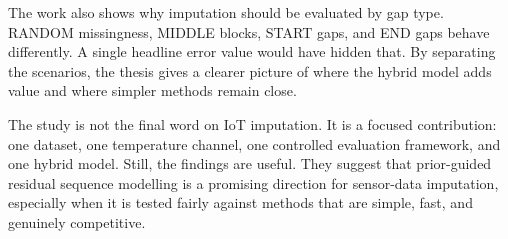 The work also shows why imputation should be evaluated by gap type. RANDOM missingness, MIDDLE blocks, START gaps, and END gaps behave differently. A single headline error value would have hidden that. By separating the scenarios, the thesis gives a clearer picture of where the hybrid model adds value and where simpler methods remain close.

The study is not the final word on IoT imputation. It is a focused contribution: one dataset, one temperature channel, one controlled evaluation framework, and one hybrid model. Still, the findings are useful. They suggest that prior-guided residual sequence modelling is a promising direction for sensor-data imputation, especially when it is tested fairly against methods that are simple, fast, and genuinely competitive.
